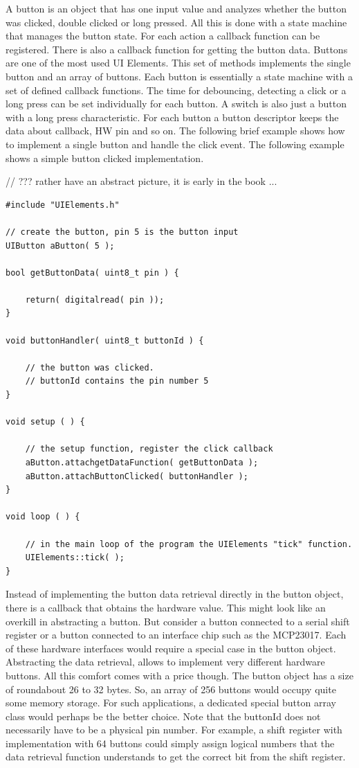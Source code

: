 
A button is an object that has one input value and analyzes whether the button was clicked, double clicked or long pressed. All this is done with a state machine that manages the button state. For each action a callback function can be registered. There is also a callback function for getting the button data. Buttons are one  of the most used UI Elements. This set of methods implements the single button and an array of buttons. Each button is essentially a state machine with a set of defined callback functions. The time for debouncing, detecting a click or a long press can be set individually for each button. A switch is also just a button with a long press characteristic. For each button a button descriptor keeps the data about callback, HW pin and so on. The following brief example shows how to implement a single button and handle the click event. The following example shows a simple button clicked implementation.

// ??? rather have an abstract picture, it is early in the book ...

\lstset{language=c++, style=codesnippetstyle}
\begin{lstlisting}
#include "UIElements.h"

// create the button, pin 5 is the button input
UIButton aButton( 5 );

bool getButtonData( uint8_t pin ) {

	return( digitalread( pin ));
}

void buttonHandler( uint8_t buttonId ) {

	// the button was clicked. 
	// buttonId contains the pin number 5
}

void setup ( ) {

	// the setup function, register the click callback
	aButton.attachgetDataFunction( getButtonData );
	aButton.attachButtonClicked( buttonHandler );
}

void loop ( ) {

    // in the main loop of the program the UIElements "tick" function.
	UIElements::tick( );
}

\end{lstlisting}
\FloatBarrier

Instead of implementing the button data retrieval directly in the button object, there is a callback that obtains the hardware value. This might look like an overkill in abstracting a button. But consider a button connected to a serial shift register or a button connected to an interface chip such as the MCP23017. Each of these hardware interfaces would require a special case in the button object. Abstracting the data retrieval, allows to implement very different hardware buttons. All this comfort comes with a price though. The button object has a size of roundabout 26 to 32 bytes. So, an array of 256 buttons would occupy quite some memory storage. For such applications, a dedicated special button array class would perhaps be the better choice. Note that the buttonId does not necessarily have to be a physical pin number. For example, a shift register with implementation with 64 buttons could simply assign logical numbers that the data retrieval function understands to get the correct bit from the shift register.

